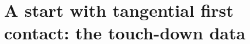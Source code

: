 %

\newcommand{\TDa}{\mathsf a}
\newcommand{\TDc}{\mathsf c}
\newcommand{\TDr}{\mathsf r}
\newcommand{\TDb}{\mathsf b}
\newcommand{\TDS}{\mathfrak S}
\newcommand{\TDT}{\mathcal T}
\newcommand{\TDta}{t_{\mathrm a}}
\newcommand{\TDtc}{t_{\mathrm c}}
\newcommand{\TDG}{\mathcal G}
\newcommand{\TDbe}{b_{\mathrm e}}
\newcommand{\TDxe}{\xi_{\mathrm e}}
\newcommand{\TDmT}{\mu_{\mathrm T}}
\newcommand{\TDY}{\Upsilon}
\newcommand{\TDSz}{\mathcal S_0}
{\theoremstyle{definition}\newtheorem{TDdefinition}{Definition}}

\section{A start with tangential first contact: the touch-down data}\label{sec:touch}

